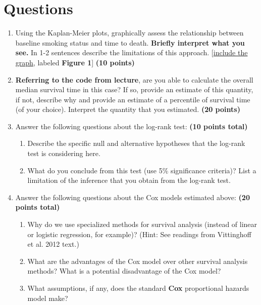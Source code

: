 \documentclass{article}\usepackage[]{graphicx}\usepackage[]{color}
\begin{document}

\else

\fi

\section*{Questions}

\vspace{2mm}

\begin{enumerate}
  \item Using the Kaplan-Meier plots, graphically assess the relationship between baseline smoking status and time to death. \textbf{Briefly interpret what you see.} In 1-2 sentences describe the limitations of this approach. [{\ul{include the graph}}, labeled \textbf{Figure 1}] \textbf{(10 points)}
  \item \textbf{Referring to the code from lecture}, are you able to calculate the overall median survival time in this case? If so, provide an estimate of this quantity, if not, describe why and provide an estimate of a percentile of survival time (of your choice). Interpret the quantity that you estimated. \textbf{(20 points)}
  \item Answer the following questions about the log-rank test: \textbf{(10 points total)}
  \begin{enumerate}
    \item Describe the specific null and alternative hypotheses that the log-rank test is considering here.
    \item What do you conclude from this test (use 5\% significance criteria)? List a limitation of the inference that you obtain from the log-rank test.
  \end{enumerate}
\item Answer the following questions about the Cox models estimated above: \textbf{(20 points total)}
  \begin{enumerate}
    \item Why do we use specialized methods for survival analysis (instead of linear or logistic regression, for example)? (Hint: See readings from Vittinghoff et al. 2012 text.)
    \item What are the advantages of the Cox model over other survival analysis methods? What is a potential disadvantage of the Cox model?
    \item What assumptions, if any, does the standard \textbf{Cox} proportional hazards model make?

\end{enumerate}
\end{enumerate}
\end{document}
